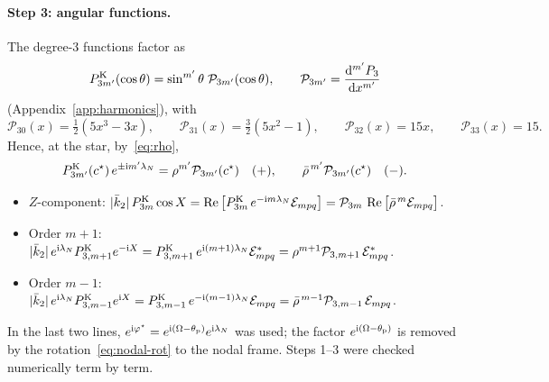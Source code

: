 \paragraph{Step 3: angular functions.} The degree-3 functions factor as
\[
  P^{\mathrm K}_{3m'}(\cos\theta)=\sin^{m'}\theta\;\mathcal P_{3m'}(\cos\theta),\qquad \mathcal P_{3m'}=\frac{\mathrm{d}^{m'}P_3}{\mathrm{d} x^{m'}}
\]
(Appendix~\ref{app:harmonics}), with
\begin{equation}
  \mathcal P_{30}(x)=\tfrac12(5x^3-3x),\qquad \mathcal P_{31}(x)=\tfrac32(5x^2-1),\qquad \mathcal P_{32}(x)=15x,\qquad \mathcal P_{33}(x)=15. \label{eq:P3m}
\end{equation}
Hence, at the star, by~\eqref{eq:rho},
\[
  P^{\mathrm K}_{3m'}(c^\star)\,e^{\pm\mathrm{i} m'\lambda_N}=\rho^{m'}\mathcal P_{3m'}(c^\star)\quad(+),\qquad \bar\rho^{\,m'}\mathcal P_{3m'}(c^\star)\quad(-).
\]
\begin{itemize}
  \item $Z$-component: $|\bar k_2|\,P^{\mathrm K}_{3m}\cos X=\operatorname{Re}\big[P^{\mathrm K}_{3m}\,e^{-\mathrm{i} m\lambda_N}\mathcal E_{mpq}\big]=\mathcal P_{3m}\,\operatorname{Re}\big[\bar\rho^{\,m}\mathcal E_{mpq}\big]$.
  \item Order $m+1$: $|\bar k_2|\,e^{\mathrm{i}\lambda_N}P^{\mathrm K}_{3,m+1}e^{-\mathrm{i} X}=P^{\mathrm K}_{3,m+1}\,e^{\mathrm{i}(m+1)\lambda_N}\mathcal E^*_{mpq}=\rho^{m+1}\mathcal P_{3,m+1}\,\mathcal E^*_{mpq}$.
  \item Order $m-1$: $|\bar k_2|\,e^{\mathrm{i}\lambda_N}P^{\mathrm K}_{3,m-1}e^{\mathrm{i} X}=P^{\mathrm K}_{3,m-1}\,e^{-\mathrm{i}(m-1)\lambda_N}\mathcal E_{mpq}=\bar\rho^{\,m-1}\mathcal P_{3,m-1}\,\mathcal E_{mpq}$.
\end{itemize}
In the last two lines, $e^{\mathrm{i}\varphi^\star}=e^{\mathrm{i}(\Omega-\theta_{\mathrm p})}e^{\mathrm{i}\lambda_N}$ was used; the factor $e^{\mathrm{i}(\Omega-\theta_{\mathrm p})}$ is removed by the rotation~\eqref{eq:nodal-rot} to the nodal frame. Steps 1--3 were checked numerically term by term.

